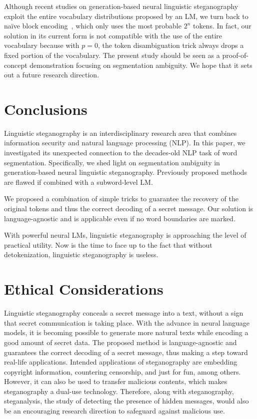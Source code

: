 \documentclass[11pt]{article}
\begin{document}
Although recent studies on generation-based neural linguistic steganography~\citep{dai-cai-2019-towards,ziegler-etal-2019-neural,shen-etal-2020-near,zhang-etal-2021-provably} exploit the entire vocabulary distributions proposed by an LM, we turn back to na\"{i}ve block encoding~\citep{fang-etal-2017-generating}, which only uses the most probable $2^n$ tokens.
In fact, our solution in its current form is not compatible with the use of the entire vocabulary because with $p=0$, the token disambiguation trick always drops a fixed portion of the vocabulary.
The present study should be seen as a proof-of-concept demonstration focusing on segmentation ambiguity.
We hope that it sets out a future research direction.

\section{Conclusions} \label{sec:conclusions}
Linguistic steganography is an interdisciplinary research area that combines information security and natural language processing (NLP).
In this paper, we investigated its unexpected connection to the decades-old NLP task of word segmentation.
Specifically, we shed light on segmentation ambiguity in generation-based neural linguistic steganography.
Previously proposed methods are flawed if combined with a subword-level LM.

We proposed a combination of simple tricks to guarantee the recovery of the original tokens and thus the correct decoding of a secret message.
Our solution is language-agnostic and is applicable even if no word boundaries are marked.

With powerful neural LMs, linguistic steganography is approaching the level of practical utility.
Now is the time to face up to the fact that without detokenization, linguistic steganography is useless.



\section*{Ethical Considerations}
Linguistic steganography conceals a secret message into a text, without a sign that secret communication is taking place.
With the advance in neural language models, it is becoming possible to generate more natural texts while encoding a good amount of secret data.
The proposed method is language-agnostic and guarantees the correct decoding of a secret message, thus making a step toward real-life applications.
Intended applications of steganography are embedding copyright information, countering censorship, and just for fun, among others.
However, it can also be used to transfer malicious contents, which makes steganography a dual-use technology.
Therefore, along with steganography, steganalysis, the study of detecting the presence of hidden messages, would also be an encouraging research direction to safeguard against malicious use.
\end{document}
